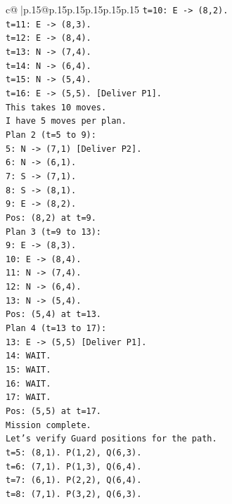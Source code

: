 \documentclass{article}
\begin{document}
{\begin{supertabular}{c@{$\;$}|p{.15\linewidth}@{}p{.15\linewidth}p{.15\linewidth}p{.15\linewidth}p{.15\linewidth}p{.15\linewidth}}
{{{\texttt{t=10: E {-}> (8,2).} \\
\texttt{t=11: E {-}> (8,3).} \\
\texttt{t=12: E {-}> (8,4).} \\
\texttt{t=13: N {-}> (7,4).} \\
\texttt{t=14: N {-}> (6,4).} \\
\texttt{t=15: N {-}> (5,4).} \\
\texttt{t=16: E {-}> (5,5). {[}Deliver P1{]}.} \\
\texttt{This takes 10 moves.} \\
\texttt{I have 5 moves per plan.} \\
\texttt{Plan 2 (t=5 to 9):} \\
\texttt{5: N {-}> (7,1) {[}Deliver P2{]}.} \\
\texttt{6: N {-}> (6,1).} \\
\texttt{7: S {-}> (7,1).} \\
\texttt{8: S {-}> (8,1).} \\
\texttt{9: E {-}> (8,2).} \\
\texttt{Pos: (8,2) at t=9.} \\
\texttt{Plan 3 (t=9 to 13):} \\
\texttt{9: E {-}> (8,3).} \\
\texttt{10: E {-}> (8,4).} \\
\texttt{11: N {-}> (7,4).} \\
\texttt{12: N {-}> (6,4).} \\
\texttt{13: N {-}> (5,4).} \\
\texttt{Pos: (5,4) at t=13.} \\
\texttt{Plan 4 (t=13 to 17):} \\
\texttt{13: E {-}> (5,5) {[}Deliver P1{]}.} \\
\texttt{14: WAIT.} \\
\texttt{15: WAIT.} \\
\texttt{16: WAIT.} \\
\texttt{17: WAIT.} \\
\texttt{Pos: (5,5) at t=17.} \\
\texttt{Mission complete.} \\
\texttt{Let's verify Guard positions for the path.} \\
\texttt{t=5: (8,1). P(1,2), Q(6,3).} \\
\texttt{t=6: (7,1). P(1,3), Q(6,4).} \\
\texttt{t=7: (6,1). P(2,2), Q(6,4).} \\
\texttt{t=8: (7,1). P(3,2), Q(6,3).} \\
}}}
\end{supertabular}}
\end{document}
